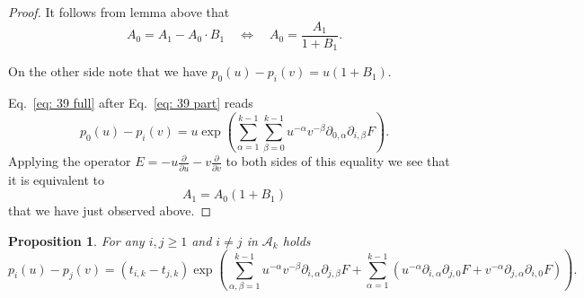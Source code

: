 \documentclass[12pt,a4paper]{amsart}
\def\A{{\mathcal A}}
\newcommand{\p}{{\partial}}
\newcommand{\<}{\left<}
\renewcommand{\>}{\right>}
\newtheorem{proposition}[theorem]{Proposition}
\numberwithin{equation}{section}
\begin{document}
\begin{proof}
It follows from lemma above that
\[
 A_0  = A_1 - A_0 \cdot B_1  \quad \Leftrightarrow \quad A_0 = \frac{A_1}{1 + B_1}.
\]

On the other side note that we have $p_0(u) - p_i(v) = u(1 + B_1)$.

Eq.~\eqref{eq: 39 full} after Eq.~\eqref{eq: 39 part} reads
\[
    p_0(u) - p_i(v) = u \exp\left( \sum_{\alpha=1}^{k-1}\sum_{\beta=0}^{k-1} u^{-\alpha} v^{-\beta} \p_{0,\alpha}\p_{i,\beta} F \right).
\]
Applying the operator $E = -u \frac{\p}{\p u} - v \frac{\p}{\p v}$ to both sides of this equality we see that it is equivalent to
\[
    A_1 = A_0 (1 + B_1)
\]
that we have just observed above.

\end{proof}

\begin{proposition}\label{prop: Eq. 41}
    For any $i,j \ge 1$ and $i \neq j$ in $\A_k$ holds
    \[
        p_i(u) - p_j(v) = (t_{i,k} - t_{j,k}) \exp\left( \sum_{\alpha,\beta=1}^{k-1} u^{-\alpha} v^{-\beta} \p_{i,\alpha}\p_{j,\beta} F + \sum_{\alpha=1}^{k-1} (u^{-\alpha} \p_{i,\alpha}\p_{j,0} F + v^{-\alpha} \p_{j,\alpha}\p_{i,0} F )\right).
    \]
\end{proposition}
\end{document}
